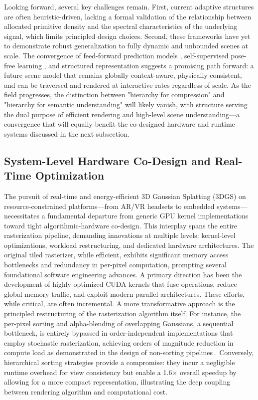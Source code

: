 \documentclass[11pt,a4paper]{article}
\begin{document}
Looking forward, several key challenges remain. First, current adaptive structures are often heuristic-driven, lacking a formal validation of the relationship between allocated primitive density and the spectral characteristics of the underlying signal, which limits principled design choices. Second, these frameworks have yet to demonstrate robust generalization to fully dynamic and unbounded scenes at scale. The convergence of feed-forward prediction models \cite{arxiv:2312.12337v4}, self-supervised pose-free learning \cite{arxiv:2508.01171v2}, and structured representation suggests a promising path forward: a future scene model that remains globally context-aware, physically consistent, and can be traversed and rendered at interactive rates regardless of scale. As the field progresses, the distinction between "hierarchy for compression" and "hierarchy for semantic understanding" will likely vanish, with structure serving the dual purpose of efficient rendering and high-level scene understanding---a convergence that will equally benefit the co-designed hardware and runtime systems discussed in the next subsection.


\subsection{System-Level Hardware Co-Design and Real-Time Optimization}


The pursuit of real-time and energy-efficient 3D Gaussian Splatting (3DGS) on resource-constrained platforms---from AR/VR headsets to embedded systems---necessitates a fundamental departure from generic GPU kernel implementations toward tight algorithmic-hardware co-design. This interplay spans the entire rasterization pipeline, demanding innovations at multiple levels: kernel-level optimizations, workload restructuring, and dedicated hardware architectures. The original tiled rasterizer, while efficient, exhibits significant memory access bottlenecks and redundancy in per-pixel computation, prompting several foundational software engineering advances. A primary direction has been the development of highly optimized CUDA kernels that fuse operations, reduce global memory traffic, and exploit modern parallel architectures. These efforts, while critical, are often incremental. A more transformative approach is the principled restructuring of the rasterization algorithm itself. For instance, the per-pixel sorting and alpha-blending of overlapping Gaussians, a sequential bottleneck, is entirely bypassed in order-independent implementations that employ stochastic rasterization, achieving orders of magnitude reduction in compute load as demonstrated in the design of non-sorting pipelines \cite{arxiv:2508.12720v3,arxiv:2402.00525v1}. Conversely, hierarchical sorting strategies \cite{arxiv:2402.00525v1} provide a compromise: they incur a negligible runtime overhead for view consistency but enable a 1.6$\times$ overall speedup by allowing for a more compact representation, illustrating the deep coupling between rendering algorithm and computational cost.
\end{document}
